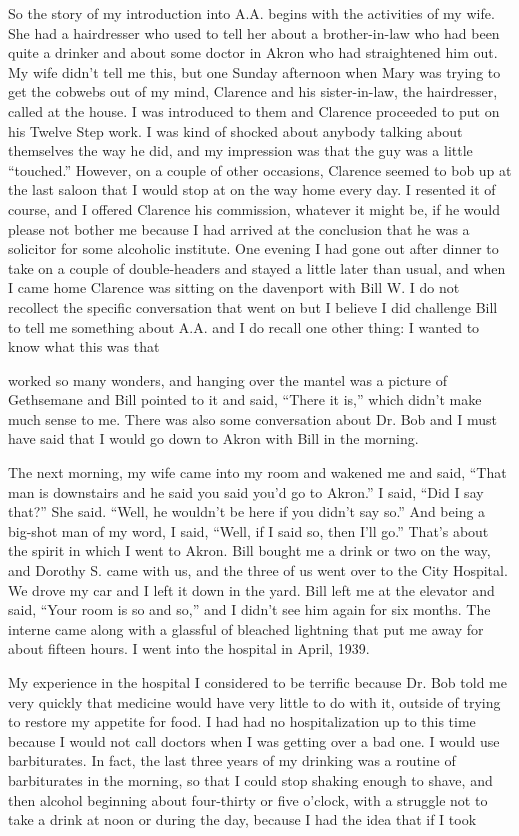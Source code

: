 \begin{biblechapter}
So the story of my introduction into A.A. begins with the activities of my wife. She had a hairdresser who used to tell her about a brother-in-law who had been quite a drinker and about some doctor in Akron who had straightened him out. My wife didn’t tell me this, but one Sunday afternoon when Mary was trying to get the cobwebs out of my mind, Clarence and his sister-in-law, the hairdresser, called at the house. I was introduced to them and Clarence proceeded to put on his Twelve Step work. I was kind of shocked about anybody talking about themselves the way he did, and my impression was that the guy was a little “touched.” However, on a couple of other occasions, Clarence seemed to bob up at the last saloon that I would stop at on the way home every day. I resented it of course, and I offered Clarence his commission, whatever it might be, if he would please not bother me because I had arrived at the conclusion that he was a solicitor for some alcoholic institute. One evening I had gone out after dinner to take on a couple of double-headers and stayed a little later than usual, and when I came home Clarence was sitting on the davenport with Bill W. I do not recollect the specific conversation that went on but I believe I did challenge Bill to tell me something about A.A. and I do recall one other thing: I wanted to know what this was that

worked so many wonders, and hanging over the mantel was a picture of Gethsemane and Bill pointed to it and said, “There it is,” which didn’t make much sense to me. There was also some conversation about Dr. Bob and I must have said that I would go down to Akron with Bill in the morning.

The next morning, my wife came into my room and wakened me and said, “That man is downstairs and he said you said you’d go to Akron.” I said, “Did I say that?” She said. “Well, he wouldn’t be here if you didn’t say so.” And being a big-shot man of my word, I said, “Well, if I said so, then I’ll go.” That’s about the spirit in which I went to Akron. Bill bought me a drink or two on the way, and Dorothy S. came with us, and the three of us went over to the City Hospital. We drove my car and I left it down in the yard. Bill left me at the elevator and said, “Your room is so and so,” and I didn’t see him again for six months. The interne came along with a glassful of bleached lightning that put me away for about fifteen hours. I went into the hospital in April, 1939.

My experience in the hospital I considered to be terrific because Dr. Bob told me very quickly that medicine would have very little to do with it, outside of trying to restore my appetite for food. I had had no hospitalization up to this time because I would not call doctors when I was getting over a bad one. I would use barbiturates. In fact, the last three years of my drinking was a routine of barbiturates in the morning, so that I could stop shaking enough to shave, and then alcohol beginning about four-thirty or five o’clock, with a struggle not to take a drink at noon or during the day, because I had the idea that if I took


\end{biblechapter}

